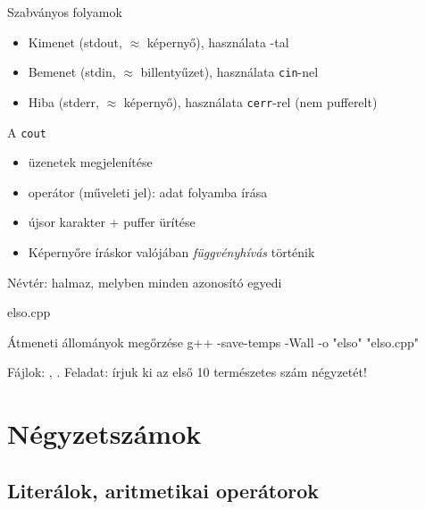 \documentclass[usenames,dvipsnames,aspectratio=169]{beamer}
\begin{document}
\begin{frame}
  Szabványos folyamok
  \begin{itemize}
    \item Kimenet (stdout, $\approx$ képernyő), használata \texttt{}-tal
    \item Bemenet (stdin, $\approx$ billentyűzet), használata \texttt{cin}-nel
    \item Hiba (stderr, $\approx$ képernyő), használata \texttt{cerr}-rel (nem pufferelt)
  \end{itemize}
  A \texttt{cout}
  \begin{itemize}
    \item üzenetek megjelenítése
    \item \texttt{\kiemel{{<}<}} operátor (műveleti jel): adat folyamba írása
    \item \texttt{} újsor karakter + puffer ürítése
    \item Képernyőre íráskor valójában \emph{függvényhívás} történik
  \end{itemize}
\end{frame}

\begin{frame}
  Névtér: halmaz, melyben minden azonosító egyedi
  \tiny
  \begin{exampleblock}{elso.cpp}
      
  \end{exampleblock}
  \begin{exampleblock}{}
      
  \end{exampleblock}
\end{frame}

\begin{frame}[fragile]
  \begin{block}{Átmeneti állományok megőrzése}
    g++ -save-temps -Wall -o "elso" "elso.cpp"
  \end{block}
  Fájlok: , .
  \vfill
  Feladat: írjuk ki az első 10 természetes szám négyzetét!
\end{frame}

\section{Négyzetszámok}
\subsection{Literálok, aritmetikai operátorok}
\end{document}
